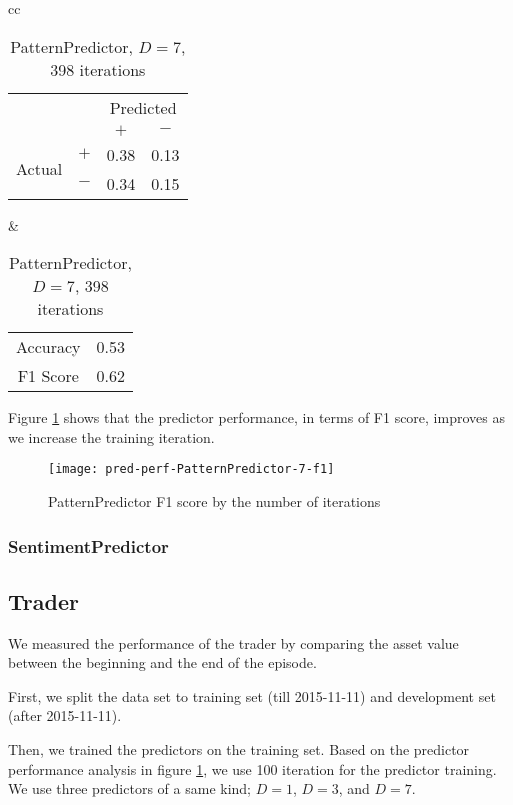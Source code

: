 \documentclass[twocolumn,10pt]{asme2ej}
\begin{document}
\begin{table}
  \begin{tabular}{cc}
    \begin{tabular}{cc|cc}
      & & \multicolumn{2}{c}{Predicted} \\
      & & $+ $ & $-$ \\
      \hline
      \multirow{2}{*}{Actual}
      & $+$ & 0.38 & 0.13 \\
      & $-$ & 0.34 & 0.15 \\
      \hline
    \end{tabular}
    &
    \begin{tabular}{cc}
      Accuracy & 0.53 \\
      F1 Score & 0.62 \\
    \end{tabular}
  \end{tabular}
  \caption{PatternPredictor, $D=7$, 398 iterations}
  \label{pred-perf-PatternPredictor-7-398}
\end{table}

Figure \ref{pred-perf-PatternPredictor-7-f1} shows that the predictor
performance, in terms of F1 score, improves as we increase the
training iteration.

\begin{figure}
  \centering
  \texttt{[image: pred-perf-PatternPredictor-7-f1]}
  \caption{PatternPredictor F1 score by the number of iterations}
  \label{pred-perf-PatternPredictor-7-f1}
\end{figure}

\subsubsection{SentimentPredictor}

\subsection{Trader}

We measured the performance of the trader by comparing the asset value between
the beginning and the end of the episode.

First, we split the data set to training set (till 2015-11-11) and development
set (after 2015-11-11). 

Then, we trained the predictors on the training set. Based on the predictor
performance analysis in figure \ref{pred-perf-PatternPredictor-7-f1}, we use 100
iteration for the predictor training. We use three predictors of a same kind;
$D=1$, $D=3$, and $D=7$.
\end{document}
